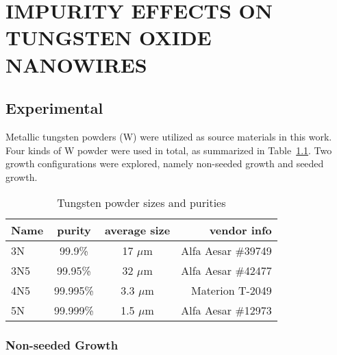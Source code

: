 
\chapter{IMPURITY EFFECTS ON TUNGSTEN OXIDE NANOWIRES}



\section{Experimental}
Metallic tungsten powders (W) were utilized as source materials in this work. Four kinds of W powder were used in total, as summarized in Table~\ref{tab:powder}. Two growth configurations were explored, namely non-seeded growth and seeded growth.

\begin{table}[htb]
\centering
\caption{Tungsten powder sizes and purities}\label{tab:powder}
\begin{tabular}{lccr}
\toprule
Name & purity & average size & vendor info\\
\midrule
3N   &  99.9\% & 17 $\mu$m & Alfa Aesar \#39749\\
3N5   &  99.95\% & 32 $\mu$m  & Alfa Aesar \#42477\\
4N5   &  99.995\% & 3.3 $\mu$m  & Materion T-2049 \\
5N   &  99.999\% & 1.5 $\mu$m & Alfa Aesar \#12973\\
\bottomrule
\end{tabular}
\end{table}

\subsection{Non-seeded Growth}\label{sec:woxnonseed}

